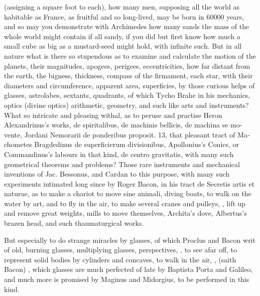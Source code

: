 {(assigning a square foot to each), how many men, supposing all the
world as habitable as France, as fruitful and so long-lived, may be
born in 60\thinspace{}000 years, and so may you demonstrate with Archimedes
how many sands the mass of the whole world might contain if all sandy,
if you did but first know how much a small cube as big as a
mustard-seed might hold, with infinite such. But in all nature what is
there so stupendous as to examine and calculate the motion of the
planets, their magnitudes, apogees, perigees, eccentricities, how far
distant from the earth, the bigness, thickness, compass of the
firmament, each star, with their diameters and circumference, apparent
area, superficies, by those curious helps of glasses, astrolabes,
sextants, quadrants, of which Tycho Brahe in his mechanics, optics
(divine optics) arithmetic, geometry, and such like arts and
instruments? What so intricate and pleasing withal, as to peruse and
practise Heron Alexandrinus's works, \textlatin{de spiritalibus, de machinis
bellicis, de machina se movente, Jordani Nemorarii de ponderibus
proposit. 13}, that pleasant tract of \textlatin{Machometes Bragdedinus de
superficierum divisionibus}, Apollonius's Conics, or Commandinus's
labours in that kind, \textlatin{de centro gravitatis}, with many such geometrical
theorems and problems? Those rare instruments and mechanical inventions
of Jac. Bessonus, and Cardan to this purpose, with many such
experiments intimated long since by Roger Bacon, in his tract de
Secretis artis et naturae, as to make a chariot to move sine
animali, diving boats, to walk on the water by art, and to fly in the
air, to make several cranes and pulleys, , lift up and remove great weights, mills to move themselves,
Archita's dove, Albertus's brazen head, and such thaumaturgical works.

But especially to do strange miracles by glasses, of which Proclus and
Bacon writ of old, burning glasses, multiplying glasses, perspectives,
, to see afar off, to represent solid
bodies by cylinders and concaves, to walk in the air, , (saith Bacon) , which glasses are much
perfected of late by Baptista Porta and Galileo, and much more is
promised by Maginus and Midorgius, to be performed in this kind.

}
